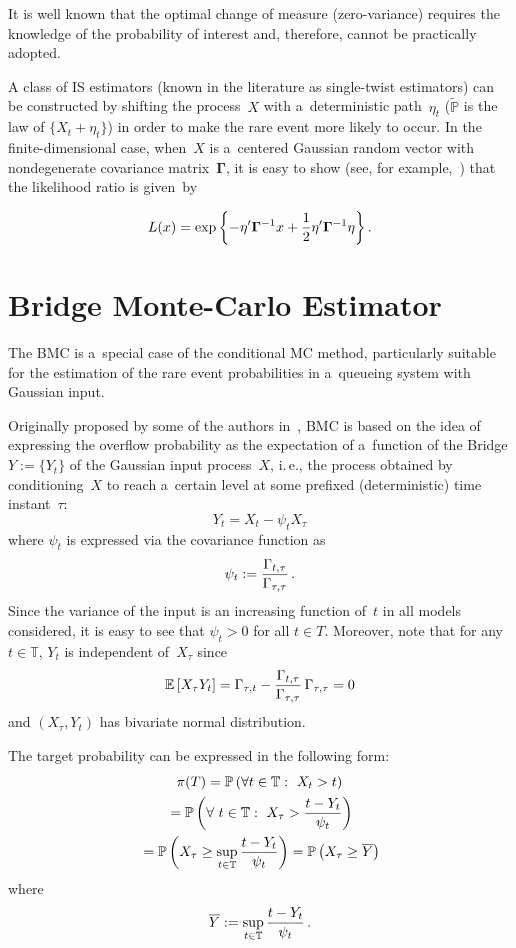 \begin{multicols}{2}
It is well known that the optimal change of measure (zero-variance) requires the 
knowledge of the probability of interest and, therefore, cannot be practically 
adopted.

A class of IS estimators (known in the literature as single-twist estimators) 
can be constructed by shifting the process~$X$ with a~deterministic path~$\eta_t$ 
($\tilde{\mathbb{P}}$ is the law of $\{X_t+\eta_t\}$) in order to make the 
rare event more likely to occur. In the finite-dimensional case, when~$X$ is 
a~centered Gaussian  random vector with nondegenerate covariance
 matrix~$\mathbf{\Gamma}$, it is easy
to show (see, for example,~\cite{Asm}) that the likelihood ratio is given~by
{

}
$$
L(x)=\exp\left\{ -\eta' \mathbf{\Gamma}^{-1}x + 
\displaystyle\frac{\displaystyle 1\mathstrut}{\displaystyle 2\mathstrut}\eta'\mathbf{\Gamma}^{-1}\eta  \right\}.
$$

\section{Bridge Monte-Carlo Estimator}

\noindent
The BMC is a~special case of the conditional MC
method, particularly suitable for the
estimation of the rare event probabilities  in a~queueing system with
Gaussian input.

Originally proposed by some of the authors in~\cite{Giordano,Giordano1,Lukashenko}, 
BMC is based on the idea of expressing the overflow probability as the
expectation of a~function of the {Bridge} $Y:=\{Y_t\}$ of the
Gaussian input process~$X$, i.\,e.,  the process obtained by
conditioning~$X$ to reach a~certain level at some prefixed (deterministic) time 
instant~$\tau$:
\begin{equation*}
Y_t = X_t - \psi_t X_{\tau}
\end{equation*}
where $\psi_t$ is expressed via the covariance function as
$$
\psi_t   :=
\displaystyle\frac{\displaystyle \Gamma_{t,\tau}\mathstrut}{\displaystyle \Gamma_{\tau, \tau}\mathstrut} \,.
$$
 Since the variance of the input is an increasing function of~$t$ 
 in all models considered,
it is easy to see that  $\psi_t>0$ for all $t \in T$.
Moreover, note that for any $t \in \mathbb{T}$, $Y_t$ is
independent of~$X_{\tau}$ since
$$
\mathbb{E}\left[X_{\tau}Y_t\right]=
\Gamma_{\tau,t}-\displaystyle\frac{\displaystyle \Gamma_{t,\tau}\mathstrut}{\displaystyle \Gamma_{\tau,\tau}\mathstrut}\,\Gamma_{\tau,\tau}=0
$$
and $(X_{\tau},Y_t)$ has bivariate normal distribution.

The target probability can be expressed in the following form:
\begin{multline*}
\pi(T)=\mathbb{P}\left(\forall t \in \mathbb{T}:\,\,X_t >t\right)\\
{}=\mathbb{P}\left( \forall\ t \in \mathbb{T}:\,\, X_{\tau}>
\displaystyle\frac{\displaystyle t-Y_t\mathstrut}{\displaystyle \psi_t\mathstrut}\right)\\
{}=\mathbb{P}\left( X_{\tau}\ge\sup\limits_{t \in \mathbb{T}}
\displaystyle\frac{\displaystyle t-Y_t\mathstrut}{\displaystyle \psi_t\mathstrut}\right)=\mathbb{P}\left( X_{\tau}\ge\overline{Y} \right)
\end{multline*}
where
\begin{equation*}
\overline{Y}:=\sup\limits_{t \in \mathbb{T}}\displaystyle\frac{\displaystyle t- Y_t\mathstrut}{\displaystyle \psi_t\mathstrut}\,. 
\end{equation*}




\end{multicols}
